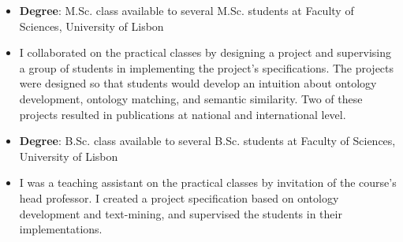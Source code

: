 \begin{itemize}
    \item \textbf{Degree}: M.Sc. class available to several M.Sc. students at Faculty of Sciences, University of Lisbon
    \item I collaborated on the practical classes by designing a project and supervising a group of students in implementing the project's specifications. The projects were designed so that students would develop an intuition about ontology development, ontology matching, and semantic similarity. Two of these projects resulted in publications at national and international level.
\end{itemize}

\begin{itemize}
    \item \textbf{Degree}: B.Sc. class available to several B.Sc. students at Faculty of Sciences, University of Lisbon
    \item I was a teaching assistant on the practical classes by invitation of the course's head professor. I created a project specification based on ontology development and text-mining, and supervised the students in their implementations.
\end{itemize}



